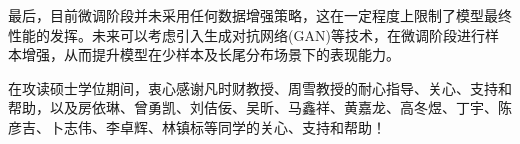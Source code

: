 \documentclass[master]{thesis-uestc}
\begin{document}
最后，目前微调阶段并未采用任何数据增强策略，这在一定程度上限制了模型最终性能的发挥。未来可以考虑引入生成对抗网络(GAN)等技术，在微调阶段进行样本增强，从而提升模型在少样本及长尾分布场景下的表现能力。

\thesisacknowledgement
在攻读硕士学位期间，衷心感谢凡时财教授、周雪教授的耐心指导、关心、支持和帮助，以及房依琳、曾勇凯、刘佶佞、吴昕、马鑫祥、黄嘉龙、高冬煜、丁宇、陈彦吉、卜志伟、李卓辉、林镇标等同学的关心、支持和帮助！

\thesisappendix



%
% 
%
% 
% 
%

\end{document}
